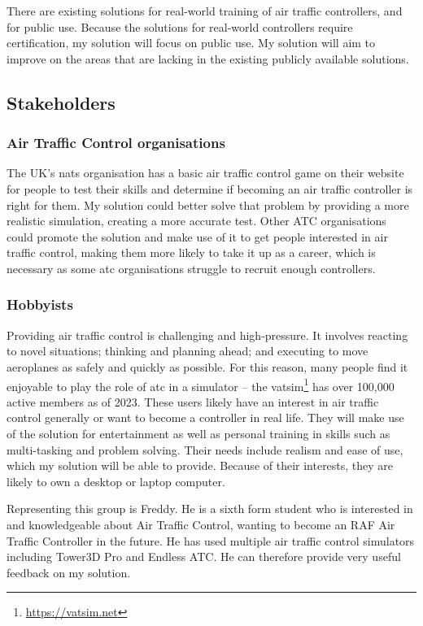 \documentclass{article}
\begin{document}
There are existing solutions for real-world training of air traffic controllers, and for public use.
Because the solutions for real-world controllers require certification, my solution will focus on public use.
My solution will aim to improve on the areas that are lacking in the existing publicly available solutions.


\subsection{Stakeholders}
\subsubsection{Air Traffic Control organisations}
The UK's \acrfull{nats} organisation has a basic air traffic control game on their website for people to test their skills and determine if becoming an air traffic controller is right for them.
My solution could better solve that problem by providing a more realistic simulation, creating a more accurate test.
Other ATC organisations could promote the solution and make use of it to get people interested in air traffic control, making them more likely to take it up as a career, which is necessary as some \acrshort{atc} organisations struggle to recruit enough controllers\cite{indiaatcshortage}.

\subsubsection{Hobbyists}
Providing air traffic control is challenging and high-pressure.
It involves reacting to novel situations; thinking and planning ahead; and executing to move aeroplanes as safely and quickly as possible\cite{natsbuzz}.
For this reason, many people find it enjoyable to play the role of \acrshort{atc} in a simulator -- the \acrfull{vatsim}\footnote{\url{https://vatsim.net}} has over 100,000 active members as of 2023.
These users likely have an interest in air traffic control generally or want to become a controller in real life.
They will make use of the solution for entertainment as well as personal training in skills such as multi-tasking and problem solving.
Their needs include realism and ease of use, which my solution will be able to provide.
Because of their interests, they are likely to own a desktop or laptop computer.

Representing this group is Freddy.
He is a sixth form student who is interested in and knowledgeable about Air Traffic Control, wanting to become an RAF Air Traffic Controller in the future.
He has used multiple air traffic control simulators including Tower3D Pro and Endless ATC.
He can therefore provide very useful feedback on my solution.
\end{document}
